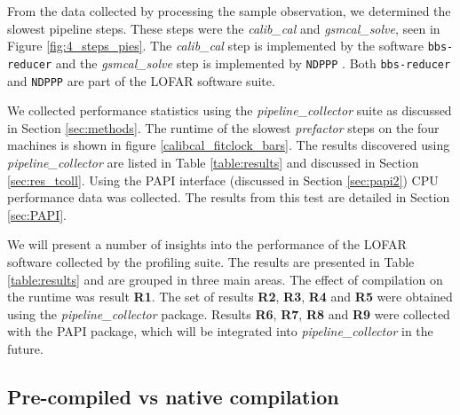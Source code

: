 From the data collected by processing the sample observation, we determined the slowest pipeline steps. These steps were the \textit{calib\_cal} and \textit{gsmcal\_solve}, seen in Figure \ref{fig:4_steps_pies}. The \textit{calib\_cal} step is implemented by the software \texttt{bbs-reducer} \citep{cookbook,bbs_selfcal} and the \textit{gsmcal\_solve} step is implemented by \texttt{NDPPP} \citep{cookbook,lofar_NDPPP}. Both \texttt{bbs-reducer} and \texttt{NDPPP} are part of the LOFAR software suite.

We collected performance statistics using the \textit{pipeline\_collector} suite as discussed in Section \ref{sec:methods}. The runtime of the slowest \textit{prefactor} steps on the four machines is shown in figure \ref{calibcal_fitclock_bars}. The results discovered using \textit{pipeline\_collector} are listed in Table \ref{table:results} and discussed in Section \ref{sec:res_tcoll}. Using the PAPI interface (discussed in Section \ref{sec:papi2}) CPU performance data was collected. The results from this test are detailed in Section \ref{sec:PAPI}.


 
We will present a number of insights into the performance of the LOFAR software collected by the profiling suite. The results are presented in Table \ref{table:results} and are grouped in three main areas. The effect of compilation on the runtime was result \textbf{R1}. The set of results \textbf{R2}, \textbf{R3}, \textbf{R4} and \textbf{R5} were obtained using the \textit{pipeline\_collector} package. Results  \textbf{R6}, \textbf{R7}, \textbf{R8} and \textbf{R9} were collected with the PAPI package, which will be integrated into \textit{pipeline\_collector} in the future.  

\subsection{Pre-compiled vs native compilation}

